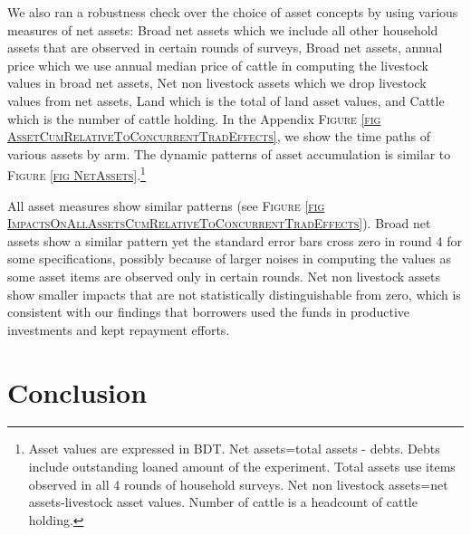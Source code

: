 	We also ran a robustness check over the choice of asset concepts by using various measures of net assets: \textsf{Broad net assets} which we include all other household assets that are observed in certain rounds of surveys, \textsf{Broad net assets, annual price} which we use annual median price of cattle in computing the livestock values in broad net assets, \textsf{Net non livestock assets} which we drop livestock values from net assets, \textsf{Land} which is the total of land asset values, and \textsf{Cattle} which is the number of cattle holding.  In the Appendix \textsc{\footnotesize Figure \ref{fig AssetCumRelativeToConcurrentTradEffects}}, we show the time paths of various assets by arm. The dynamic patterns of asset accumulation is similar to \textsc{\footnotesize Figure \ref{fig NetAssets}}.\footnote{Asset values are expressed in BDT. \textsf{Net assets}=total assets - debts. Debts include outstanding loaned amount of the experiment. Total assets use items observed in all 4 rounds of household surveys. \textsf{Net non livestock assets}=\textsf{net assets}-livestock asset values. \textsf{Number of cattle} is a headcount of cattle holding.  } 

	All asset measures show similar patterns (see \textsc{\footnotesize Figure \ref{fig ImpactsOnAllAssetsCumRelativeToConcurrentTradEffects}}). \textsf{Broad net assets} show a similar pattern yet the standard error bars cross zero in round 4 for some specifications, possibly because of larger noises in computing the values as some asset items are observed only in certain rounds. \textsf{Net non livestock assets} show smaller impacts that are not statistically distinguishable from zero, which is consistent with our findings that borrowers used the funds in productive investments and kept repayment efforts. 




\section{Conclusion}
\label{SecConclusion}

